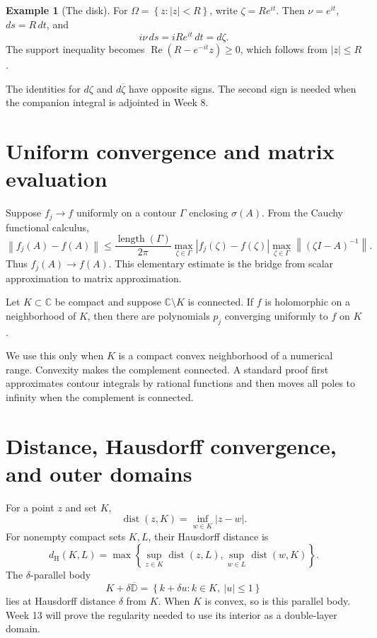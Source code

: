 \documentclass[11pt,oneside,openany]{book}
\theoremstyle{definition}
\newtheorem{example}[theorem]{Example}
\theoremstyle{remark}
\newcommand{\C}{\mathbb C}
\newcommand{\D}{\mathbb D}
\newcommand{\dist}{\operatorname{dist}}
\newcommand{\RePart}{\operatorname{Re}}
\newcommand{\spec}{\sigma}
\newcommand{\norm}[1]{\left\lVert #1\right\rVert}
\newcommand{\set}[1]{\left\{#1\right\}}
\newcommand{\olD}{\overline{\D}}
\begin{document}
\begin{example}[The disk]
For \(\Omega=\set{z:|z|<R}\), write
\(\zeta=Re^{it}\).  Then \(\nu=e^{it}\), \(ds=R\,dt\), and
\[
  i\nu\,ds=iRe^{it}\,dt=d\zeta.
\]
The support inequality becomes
\(\RePart(R-e^{-it}z)\geq0\), which follows from \(|z|\leq R\).
\end{example}

\begin{pitfall}
The identities for \(d\zeta\) and \(d\overline\zeta\) have opposite
signs.  The second sign is needed when the companion integral is
adjointed in Week 8.
\end{pitfall}

\section{Uniform convergence and matrix evaluation}

Suppose \(f_j\to f\) uniformly on a contour \(\Gamma\) enclosing
\(\spec(A)\).  From the Cauchy functional calculus,
\[
  \norm{f_j(A)-f(A)}
  \leq \frac{\operatorname{length}(\Gamma)}{2\pi}
  \max_{\zeta\in\Gamma}|f_j(\zeta)-f(\zeta)|
  \max_{\zeta\in\Gamma}\norm{(\zeta I-A)^{-1}}.
\]
Thus \(f_j(A)\to f(A)\).  This elementary estimate is the bridge from
scalar approximation to matrix approximation.

\begin{blackbox}
Let \(K\subset\C\) be compact and suppose \(\C\setminus K\) is
connected.  If \(f\) is holomorphic on a neighborhood of \(K\), then
there are polynomials \(p_j\) converging uniformly to \(f\) on \(K\).

We use this only when \(K\) is a compact convex neighborhood of a
numerical range.  Convexity makes the complement connected.  A standard
proof first approximates contour integrals by rational functions and
then moves all poles to infinity when the complement is connected.
\end{blackbox}

\section{Distance, Hausdorff convergence, and outer domains}

For a point \(z\) and set \(K\),
\[
  \dist(z,K)=\inf_{w\in K}|z-w|.
\]
For nonempty compact sets \(K,L\), their Hausdorff distance is
\[
  d_{\mathrm H}(K,L)=
  \max\left\{\sup_{z\in K}\dist(z,L),
             \sup_{w\in L}\dist(w,K)\right\}.
\]
The \(\delta\)-parallel body
\[
  K+\delta\olD=\set{k+\delta u:k\in K,\ |u|\leq1}
\]
lies at Hausdorff distance \(\delta\) from \(K\).  When \(K\) is
convex, so is this parallel body.  Week 13 will prove the regularity
needed to use its interior as a double-layer domain.
\end{document}

